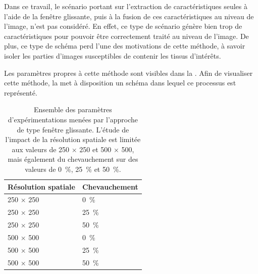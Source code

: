 Dans ce travail, le scénario portant sur l'extraction de caractéristiques seules à l'aide de la fenêtre glissante, puis à la fusion de ces caractéristiques au niveau de l'image, n'est pas considéré. En effet, ce type de scénario génère bien trop de caractéristiques pour pouvoir être correctement traité au niveau de l'image. De plus, ce type de schéma perd l'une des motivations de cette méthode, à savoir isoler les parties d'images susceptibles de contenir les tissus d'intérêts.\par
 
Les paramètres propres à cette méthode sont visibles dans la . Afin de visualiser cette méthode, la  met à disposition un schéma dans lequel ce processus est représenté.\par

\begin{table}[H]
    \centering
    \begin{tabular*}{0,6\linewidth}{l@{\extracolsep{\fill}}l}
        \toprule
        \textbf{Résolution spatiale}& \textbf{Chevauchement}\\ \hline
        250 $\times$ 250              & 0~\%                  \\ \hline
        250 $\times$ 250              & 25~\%                 \\ \hline
        250 $\times$ 250              & 50~\%                 \\ \hline 
        500 $\times$ 500              & 0~\%                  \\ \hline
        500 $\times$ 500              & 25~\%                 \\ \hline
        500 $\times$ 500              & 50~\%                 \\
        \bottomrule
    \end{tabular*}
    \caption{Ensemble des paramètres d'expérimentations menées par l'approche de type fenêtre glissante. L'étude de l'impact de la résolution spatiale est limitée aux valeurs de 250 $\times$ 250 et 500 $\times$ 500, mais également du chevauchement sur des valeurs de 0~\%, 25~\% et 50~\%.}
    \label{tab:parameters_image_improvement_sliding_window_parameters}
\end{table}\par

